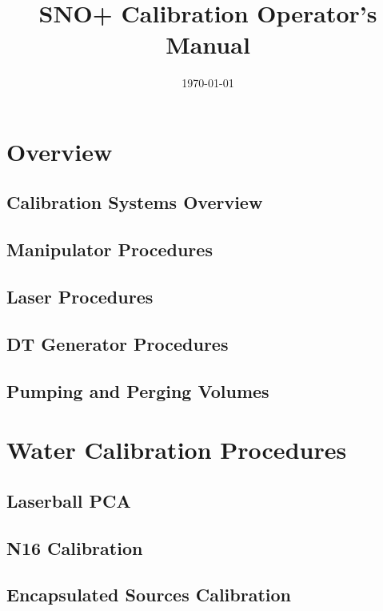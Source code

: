 \documentclass[10pt]{report}
\title{SNO+ Calibration Operator's Manual}
\date{\today}
\begin{document}
\maketitle
\pagebreak
\part{Overview}


\chapter{Calibration Systems Overview}




\chapter{Manipulator Procedures}

\chapter{Laser Procedures}

\chapter{DT Generator Procedures}


\chapter{Pumping and Perging Volumes}
\part{Water Calibration Procedures}
\chapter{Laserball PCA}

\chapter{N16 Calibration}

\chapter{Encapsulated Sources Calibration}

\end{document}
